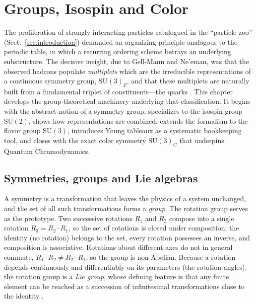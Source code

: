 \section{Groups, Isospin and Color}
\label{sec:groups}

The proliferation of strongly interacting particles catalogued in the
``particle zoo'' (Sect.~\ref{sec:introduction}) demanded an organizing principle
analogous to the periodic table, in which a recurring ordering scheme betrays an
underlying substructure. The decisive insight, due to Gell-Mann and Ne'eman, was
that the observed hadrons populate \emph{multiplets} which are the irreducible
representations of a continuous symmetry group, $\mathrm{SU(3)}_{F}$, and that these
multiplets are naturally built from a fundamental triplet of constituents---the
quarks \cite[Ch.~1]{Amsler2018}. This chapter develops the group-theoretical
machinery underlying that classification. It begins with the abstract notion of a
symmetry group, specializes to the isospin group $\mathrm{SU}(2)$, shows how
representations are combined, extends the formalism to the flavor group
$\mathrm{SU}(3)$, introduces Young tableaux as a systematic bookkeeping tool, and
closes with the exact color symmetry $\mathrm{SU(3)}_{C}$ that underpins Quantum
Chromodynamics.

\subsection{Symmetries, groups and Lie algebras}
\label{subsec:symmetries}

A symmetry is a transformation that leaves the physics of a system unchanged, and
the set of all such transformations forms a \emph{group}. The rotation group serves
as the prototype. Two successive rotations $R_1$ and $R_2$ compose into a single
rotation $R_3 = R_2 \cdot R_1$, so the set of rotations is closed under composition;
the identity (no rotation) belongs to the set, every rotation possesses an inverse,
and composition is associative. Rotations about different axes do not in general
commute, $R_1 \cdot R_2 \neq R_2 \cdot R_1$, so the group is non-Abelian. Because a
rotation depends continuously and differentiably on its parameters (the rotation
angles), the rotation group is a \emph{Lie group}, whose defining feature is that
any finite element can be reached as a succession of infinitesimal transformations
close to the identity \cite[Ch.~6]{Amsler2018}.

